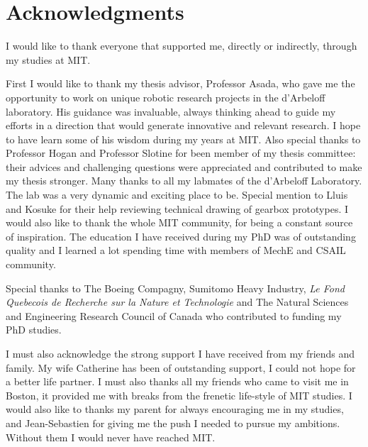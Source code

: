 \section*{Acknowledgments}

I would like to thank everyone that supported me, directly or indirectly, through my studies at MIT. 

First I would like to thank my thesis advisor, Professor Asada, who gave me the opportunity to work on unique robotic research projects in the d'Arbeloff laboratory. His guidance was invaluable, always thinking ahead to guide my efforts in a direction that would generate innovative and relevant research. I hope to have learn some of his wisdom during my years at MIT. Also special thanks to Professor Hogan and Professor Slotine for been member of my thesis committee: their advices and challenging questions were appreciated and contributed to make my thesis stronger. Many thanks to all my labmates of the d'Arbeloff Laboratory. The lab was a very dynamic and exciting place to be. Special mention to Lluis and Kosuke for their help reviewing technical drawing of gearbox prototypes. I would also like to thank the whole MIT community, for being a constant source of inspiration. The education I have received during my PhD was of outstanding quality and I learned a lot spending time with members of MechE and CSAIL community.

Special thanks to The Boeing Compagny, Sumitomo Heavy Industry, \textit{Le Fond Quebecois de Recherche sur la Nature et Technologie} and The Natural Sciences and Engineering Research Council of Canada who contributed to funding my PhD studies.

I must also acknowledge the strong support I have received from my friends and family. My wife Catherine has been of outstanding support, I could not hope for a better life partner. I must also thanks all my friends who came to visit me in Boston, it provided me with breaks from the frenetic life-style of MIT studies. I would also like to thanks my parent for always encouraging me in my studies, and Jean-Sebastien for giving me the push I needed to pursue my ambitions. Without them I would never have reached MIT. 
